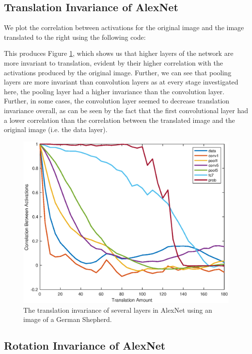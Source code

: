 \documentclass[11pt, oneside]{article}
\begin{document}
\subsection{Translation Invariance of AlexNet}

We plot the correlation between activations for the original image and the image translated to the right using the following code:

This produces Figure \ref{fig:netTrans}, which shows us that higher layers of the network are more invariant to translation, evident by their higher correlation with the activations produced by the original image. Further, we can see that pooling layers are more invariant than convolution layers as at every stage investigated here, the pooling layer had a higher invariance than the convolution layer. Further, in some cases, the convolution layer seemed to decrease translation invariance overall, as can be seen by the fact that the first convolutional layer had a lower correlation than the correlation between the translated image and the original image (i.e. the data layer).

\begin{figure}[ht!]
\includegraphics[width=1\textwidth]{trans_invar.eps}
\caption{The translation invariance of several layers in AlexNet using an image of a German Shepherd.}
\label{fig:netTrans}
\end{figure}

\subsection{Rotation Invariance of AlexNet}
\end{document}
